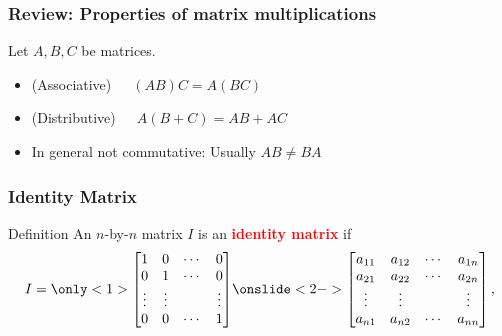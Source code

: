 \begin{frame}
  \frametitle{Review: Properties of matrix multiplications}

  Let $A,B,C$ be matrices.
  
  \begin{itemize}
  \item (Associative)\ \ \ $(AB)C = A(BC)$
  \item (Distributive)\ \ \ $A(B+C) = AB + AC$
  \item In general not commutative:  Usually $AB \neq BA$
  \end{itemize}
\end{frame}

\begin{frame}
  \frametitle{Identity Matrix}

  \begin{block}{Definition}
    An $n$-by-$n$ matrix $I$ is an \textcolor{red}{\bf identity
      matrix} if
    \[
    I=
    \only<1>{
    \begin{bmatrix}
      1 & 0 & \cdots & 0 \\
      0 & 1 & \cdots & 0 \\
      \vdots & \vdots &  & \vdots \\
      0 & 0 & \cdots & 1 \\
    \end{bmatrix}
    }
    \onslide<2->{
    \begin{bmatrix}
      a_{11} & a_{12} & \cdots & a_{1n} \\
      a_{21} & a_{22} & \cdots & a_{2n} \\
      \vdots & \vdots &  & \vdots \\
      a_{n1} & a_{n2} & \cdots & a_{nn} \\
    \end{bmatrix},
    }
    \]
  \end{block}
  
\end{frame}

